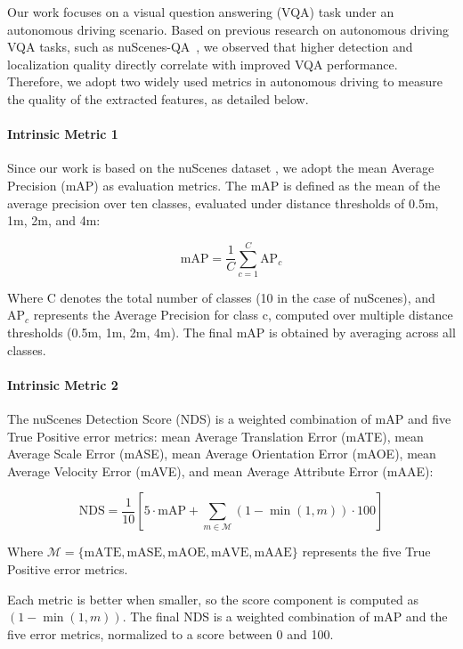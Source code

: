 \documentclass{article} %
\begin{document}
Our work focuses on a visual question answering (VQA) task under an autonomous driving scenario. Based on previous research on autonomous driving VQA tasks, such as nuScenes-QA~\cite{qian2024nuscenes}, we observed that higher detection and localization quality directly correlate with improved VQA performance. Therefore, we adopt two widely used metrics in autonomous driving to measure the quality of the extracted features, as detailed below.

\paragraph{Intrinsic Metric 1}

Since our work is based on the nuScenes dataset \cite{Caesar2019nuScenesAM}, we adopt the mean Average Precision (mAP) as evaluation metrics. The mAP is defined as the mean of the average precision over ten classes, evaluated under distance thresholds of 0.5m, 1m, 2m, and 4m:

\begin{equation}
\text{mAP} = \frac{1}{C} \sum_{c=1}^{C} \text{AP}_c
\end{equation}

Where C denotes the total number of classes (10 in the case of nuScenes), and $\text{AP}_c$ represents the Average Precision for class c, computed over multiple distance thresholds (0.5m, 1m, 2m, 4m). The final mAP is obtained by averaging across all classes.

\paragraph{Intrinsic Metric 2}

The nuScenes Detection Score (NDS) is a weighted combination of mAP and five True Positive error metrics: mean Average Translation Error (mATE), mean Average Scale Error (mASE), mean Average Orientation Error (mAOE), mean Average Velocity Error (mAVE), and mean Average 
Attribute Error (mAAE):

\begin{equation}
\text{NDS} = \frac{1}{10} \left[5 \cdot \text{mAP} + \sum_{m \in \mathcal{M}} (1 - \min(1, m)) \cdot 100 \right]
\end{equation}

Where $\mathcal{M} = \{\text{mATE}, \text{mASE}, \text{mAOE}, \text{mAVE}, \text{mAAE} \}$ represents the five True Positive error metrics.

Each metric is better when smaller, so the score component is computed as $(1 - \min(1, m))$.
The final NDS is a weighted combination of mAP and the five error metrics, normalized to a score between 0 and 100.
\end{document}
